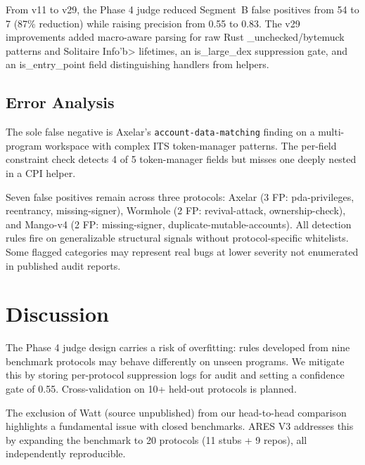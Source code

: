 \documentclass[conference]{IEEEtran}
\begin{document}
From v11 to v29, the Phase 4 judge reduced Segment~B false positives from 54 to 7 (87\% reduction) while raising precision from 0.55 to 0.83. The v29 improvements added macro-aware parsing for raw Rust \_unchecked/bytemuck patterns and Solitaire Info'{}b> lifetimes, an is\_large\_dex suppression gate, and an is\_entry\_point field distinguishing handlers from helpers.

\subsection{Error Analysis}

The sole false negative is Axelar'{}s \texttt{account-data-matching} finding on a multi-program workspace with complex ITS token-manager patterns. The per-field constraint check detects 4 of 5 token-manager fields but misses one deeply nested in a CPI helper.

Seven false positives remain across three protocols: Axelar (3 FP: pda-privileges, reentrancy, missing-signer), Wormhole (2 FP: revival-attack, ownership-check), and Mango-v4 (2 FP: missing-signer, duplicate-mutable-accounts). All detection rules fire on generalizable structural signals without protocol-specific whitelists. Some flagged categories may represent real bugs at lower severity not enumerated in published audit reports.

\section{Discussion}
\label{sec:discuss}

The Phase 4 judge design carries a risk of overfitting: rules developed from nine benchmark protocols may behave differently on unseen programs. We mitigate this by storing per-protocol suppression logs for audit and setting a confidence gate of 0.55. Cross-validation on 10+ held-out protocols is planned.

The exclusion of Watt (source unpublished) from our head-to-head comparison highlights a fundamental issue with closed benchmarks. ARES V3 addresses this by expanding the benchmark to 20 protocols (11 stubs + 9 repos), all independently reproducible.
\end{document}
